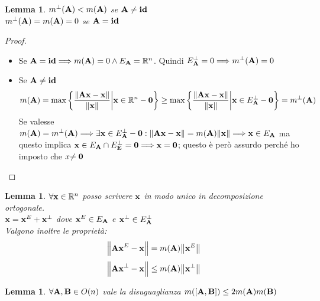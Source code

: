 \documentclass[10pt,a4paper]{article}
\newtheorem{lemma}[theorem]{Lemma}
\begin{document}
\begin{lemma}
$m^{\perp}(\vb{A}) < m(\vb{A})$ se $\vb{A \neq id} $\\
$m^{\perp}(\vb{A}) = m(\vb{A}) = 0$ se $\vb{A = id}$

\end{lemma}

\begin{proof}
\begin{itemize}
\item Se $\vb{A = id} \Longrightarrow m(\vb{A}) = 0 \land E_{\vb{A}} = \mathbb{R}^n$. Quindi $E^{\perp}_{\vb{A}} = {0} \Longrightarrow m^{\perp}(\vb{A}) = 0$

\item Se $\vb{A \neq id}$ \\
\[ m(\vb{A}) = \max \bigg\{ \frac{\norm{\vb{Ax-x}}}{\norm{\vb{x}}} \bigg|  \vb{x} \in \mathbb{R}^{n}-\vb{0} \bigg\} 
\geq \max \bigg\{ \frac{\norm{\vb{Ax-x}}}{\norm{\vb{x}}} \bigg|  \vb{x} \in E^{\perp}_{\vb{A}} - \vb{0} \bigg\} =  m^{\perp}(\vb{A}) \]
Se valesse $m(\vb{A}) = m^{\perp}(\vb{A}) \Longrightarrow \exists \vb{x} \in E^{\perp}_{\vb{A}} - \vb{0} : \norm{\vb{Ax-x}} = m(\vb{A})\norm{\vb{x}} \Longrightarrow \vb{x} \in E_{\vb{A}}$  ma questo implica $\vb{x} \in E_{\vb{A}} \cap E^{\perp}_{\vb{E}} = {\vb{0}} \Longrightarrow \vb{x = 0} $;  questo è però assurdo perché ho imposto che $x\vb{ \neq 0}$ 
\end{itemize}
\end{proof}

\begin{lemma}
$\forall \vb{x} \in \mathbb{R}^n $ posso scrivere $\vb{x}$ in modo unico in decomposizione ortogonale. \\
$\vb{x} = \vb{x}^E + \vb{x}^{\perp}$ dove $\vb{x}^E \in E_{\vb{A}}$ e $\vb{x}^{\perp} \in E^{\perp}_{\vb{A}}$ \\
Valgono inoltre le proprietà:
\[ \norm{\vb{Ax}^E - \vb{x} }= m(\vb{A})\norm{\vb{x}^E} \] \[\norm{\vb{Ax}^{\perp} - \vb{x}} \leq m(\vb{A}) \norm{\vb{x}^{\perp}} \]
\end{lemma}

\begin{lemma}
 $\forall \vb{ A, B} \in O(n)$ vale la disuguaglianza $ m([\vb{A,B}]) \leq 2m(\vb{A})m(\vb{B})$ 
\end{lemma}
\end{document}
